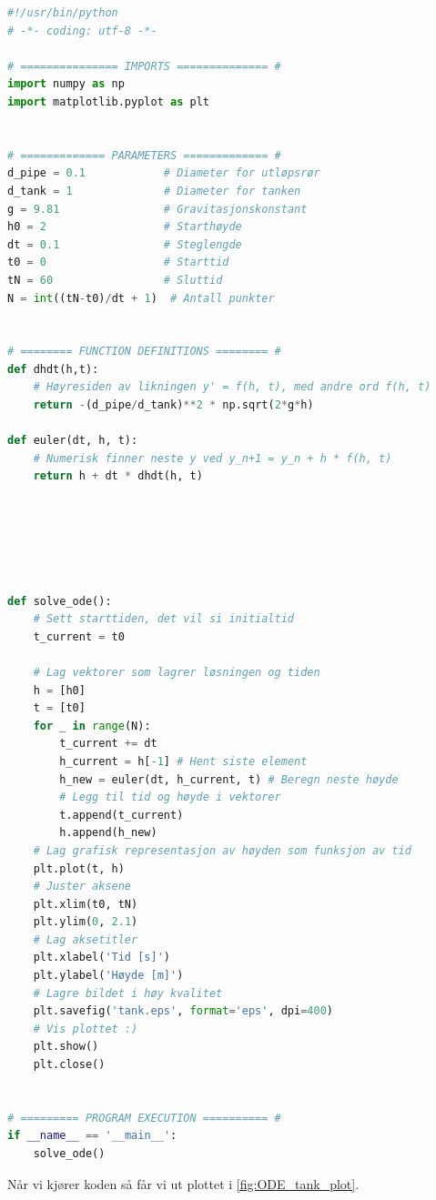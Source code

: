 \begin{lstlisting}[language=python]
#!/usr/bin/python
# -*- coding: utf-8 -*-

# =============== IMPORTS ============== #
import numpy as np
import matplotlib.pyplot as plt


# ============= PARAMETERS ============= #
d_pipe = 0.1            # Diameter for utløpsrør
d_tank = 1              # Diameter for tanken
g = 9.81                # Gravitasjonskonstant
h0 = 2                  # Starthøyde
dt = 0.1                # Steglengde
t0 = 0                  # Starttid
tN = 60                 # Sluttid
N = int((tN-t0)/dt + 1)  # Antall punkter


# ======== FUNCTION DEFINITIONS ======== #
def dhdt(h,t):
    # Høyresiden av likningen y' = f(h, t), med andre ord f(h, t)
    return -(d_pipe/d_tank)**2 * np.sqrt(2*g*h)

def euler(dt, h, t):
    # Numerisk finner neste y ved y_n+1 = y_n + h * f(h, t)
    return h + dt * dhdt(h, t)






def solve_ode():
    # Sett starttiden, det vil si initialtid
    t_current = t0
    
    # Lag vektorer som lagrer løsningen og tiden
    h = [h0]
    t = [t0]
    for _ in range(N):
        t_current += dt
        h_current = h[-1] # Hent siste element
        h_new = euler(dt, h_current, t) # Beregn neste høyde
        # Legg til tid og høyde i vektorer
        t.append(t_current)
        h.append(h_new)
    # Lag grafisk representasjon av høyden som funksjon av tid
    plt.plot(t, h)
    # Juster aksene
    plt.xlim(t0, tN)
    plt.ylim(0, 2.1)
    # Lag aksetitler
    plt.xlabel('Tid [s]')
    plt.ylabel('Høyde [m]')
    # Lagre bildet i høy kvalitet
    plt.savefig('tank.eps', format='eps', dpi=400)
    # Vis plottet :)
    plt.show()
    plt.close()


# ========= PROGRAM EXECUTION ========== #
if __name__ == '__main__':
    solve_ode()

\end{lstlisting}

Når vi kjører koden så får vi ut plottet i \cref{fig:ODE_tank_plot}.

